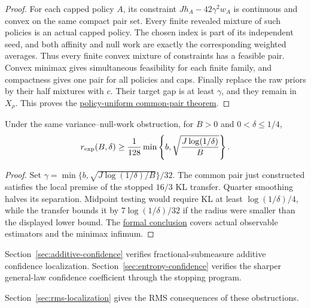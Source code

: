 \begin{proof}
For each capped policy $A$, its constraint
$J h_A-42\gamma^2w_A$ is continuous and convex on the same compact
pair set. Every finite revealed mixture of such policies is an actual
capped policy. The chosen index is part of its independent seed,
and both affinity and null work are exactly the corresponding
weighted averages. Thus every finite convex mixture of constraints
has a feasible pair. Convex minimax gives simultaneous feasibility
for each finite family, and compactness gives one pair for all
policies and caps. Finally replace the raw priors by their half
mixtures with $c$. Their target gap is at least $\gamma$, and they
remain in $X_\rho$. This proves the
\href{https://github.com/davidiach/adaptive-threshold-estimation/blob/8cf32f7e4092929d46eb87ecbb67b1e231bbcaec/lean/ThresholdHC/ConfidenceLocalization/CommonPair.lean}{policy-uniform common-pair theorem}.
\end{proof}

\begin{corollary}
\label{cor:common-pair-confidence}
Under the same variance--null-work obstruction, for $B>0$ and
$0<\delta\le1/4$,
\[
 r_{\rm exp}(B,\delta)\ge
 \frac1{128}\min\left\{b,\sqrt{\frac{J\log(1/\delta)}{B}}\right\}.
\]
\end{corollary}
\begin{proof}
Set $\gamma=\min\{b,\sqrt{J\log(1/\delta)/B}\}/32$.
The common pair just constructed satisfies the local premise of the
stopped $16/3$ KL transfer. Quarter smoothing halves its separation.
Midpoint testing would require KL at least
$\log(1/\delta)/4$, while the transfer bounds it by
$7\log(1/\delta)/32$ if the radius were smaller than the displayed
lower bound. The
\href{https://github.com/davidiach/adaptive-threshold-estimation/blob/8cf32f7e4092929d46eb87ecbb67b1e231bbcaec/lean/ThresholdHC/ConfidenceLocalization/ConfidenceRate.lean}{formal conclusion}
covers actual observable estimators and the minimax infimum.
\end{proof}

Section~\ref{sec:additive-confidence} verifies fractional-submeasure
additive confidence localization. Section~\ref{sec:entropy-confidence}
verifies the sharper general-law confidence coefficient through the
stopping program.

Section~\ref{sec:rms-localization} gives the RMS consequences of these obstructions.
